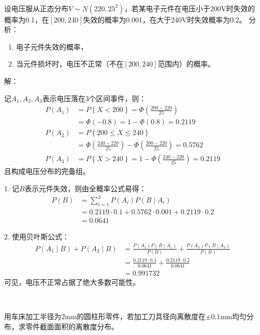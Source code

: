 ~

\begin{example}
设电压服从正态分布$V\sim N\left( 220,25^2 \right) $，若某电子元件在电压小于200V时失效的概率为0.1，在$\left[ 200,240 \right] $失效的概率为0.001，在大于240V时失效概率为0.2。
分析：
\begin{enumerate}
    \item 电子元件失效的概率，
    \item 当元件损坏时，电压不正常（不在$\left[ 200,240 \right] $范围内）的概率。
\end{enumerate}
\end{example}

解：

记$A_1,A_2,A_3$表示电压落在3个区间事件，则：
\begin{align*}
P\left( A_1 \right) &=P\left\{ X<200 \right\} =\varPhi \left( \frac{200-220}{25} \right) \\
&=\varPhi \left( -0.8 \right) =1-\varPhi \left( 0.8 \right) =0.2119 \\
P\left( A_2 \right) &=P\left\{ 200\leqslant X\leqslant 240 \right\} \\
&=\varPhi \left( \frac{240-220}{25} \right) -\varPhi \left( \frac{200-220}{25} \right) =0.5762 \\
P\left( A_3 \right) &=P\left\{ X>240 \right\} =1-\varPhi \left( \frac{240-220}{25} \right) =0.2119
\end{align*}
且构成电压分布的完备组。

1. 记$B$表示元件失效，则由全概率公式易得：
\begin{align*}
P\left( B \right) &=\sum_{i=1}^3{P\left( A_i \right) P\left( B \middle| A_i \right)} \\
&=0.2119\cdot 0.1+0.5762\cdot 0.001+0.2119\cdot 0.2 \\
&=0.0641
\end{align*}

2. 使用贝叶斯公式：
\begin{align*}
P\left( A_1 \middle| B \right) +P\left( A_3 \middle| B \right) &=\frac{P\left( A_1 \right) P\left( B \middle| A_1 \right)}{P\left( B \right)}+\frac{P\left( A_3 \right) P\left( B \middle| A_3 \right)}{P\left( B \right)} \\
&=\frac{0.2119\cdot 0.1}{0.0641}+\frac{0.2119\cdot 0.2}{0.0641} \\
&=0.991732
\end{align*}
可见，电压不正常占据了绝大多数可能性。

~

\begin{example}
用车床加工半径为$2\mathrm{mm}$的圆柱形零件，若加工刀具径向离散度在$\pm 0.1\mathrm{mm}$均匀分布，求零件截面面积的离散度分布。
\end{example}

